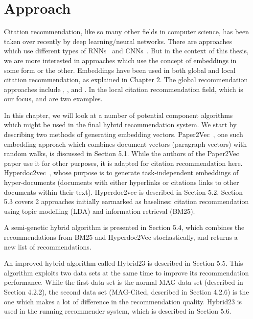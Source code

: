 \chapter{Approach}\label{chap:approach}

Citation recommendation, like so many other fields in computer science, has been taken over recently by deep learning/neural networks. There are approaches which use different types of RNNs~\cite{Kobayashi2018, YangZCDMGD18} and CNNs~\cite{Ebesu2017, YinL17}. But in the context of this thesis, we are more interested in approaches which use the concept of embeddings in some form or the other. Embeddings have been used in both global and local citation recommendation, as explained in Chapter 2. 
The global recommendation approaches include  \cite{JiangLL18}, \cite{JiangYGLL18}, \cite{CaiHY18} and \cite{ZhangYCD18}. 
In the local citation recommendation field, which is our focus, \cite{TangWZ14} and \cite{Huang2015} are two examples. 

In this chapter, we will look at a number of potential component algorithms which might be used in the final hybrid recommendation system. We start by describing two methods of generating embedding vectors. 
Paper2Vec~\cite{GangulyP17}, one such embedding approach which combines document vectors (paragraph vectors) with random walks, is discussed in Section 5.1. While the authors of the Paper2Vec paper use it for other purposes, it is adapted for citation recommendation here.
Hyperdoc2vec~\cite{ShiSZZH18}, whose purpose is to generate task-independent embeddings of hyper-documents (documents with either hyperlinks or citations links to other documents within their text). Hyperdoc2vec is described in Section 5.2. Section 5.3 covers 2 approaches initially earmarked as baselines: citation recommendation using topic modelling (LDA) and information retrieval (BM25). 

A semi-genetic hybrid algorithm is presented in Section 5.4, which combines the recommendations from BM25 and Hyperdoc2Vec stochastically, and returns a new list of recommendations. 

An improved hybrid algorithm called Hybrid23 is described in Section 5.5. This algorithm exploits two data sets at the same time to improve its recommendation performance. While the first data set is the normal MAG data set (described in Section 4.2.2), the second data set (MAG-Cited, described in Section 4.2.6) is the one which makes a lot of difference in the recommendation quality. Hybrid23 is used in the running recommender system, which is described in Section 5.6. 
